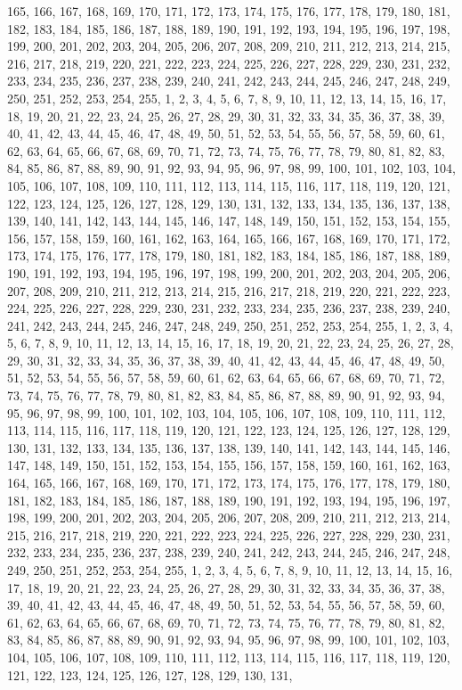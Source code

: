 165, 166, 167, 168, 169, 170, 171, 172, 173, 174, 175, 176, 177, 178, 179, 180, 181, 182, 183, 184, 185, 186, 187, 188, 189, 190, 191, 192, 193, 194, 195, 196, 197, 198, 199, 200, 201, 202, 203, 204, 205, 206, 207, 208, 209, 210, 211, 212, 213, 214, 215, 216, 217, 218, 219, 220, 221, 222, 223, 224, 225, 226, 227, 228, 229, 230, 231, 232, 233, 234, 235, 236, 237, 238, 239, 240, 241, 242, 243, 244, 245, 246, 247, 248, 249, 250, 251, 252, 253, 254, 255, 1, 2, 3, 4, 5, 6, 7, 8, 9, 10, 11, 12, 13, 14, 15, 16, 17, 18, 19, 20, 21, 22, 23, 24, 25, 26, 27, 28, 29, 30, 31, 32, 33, 34, 35, 36, 37, 38, 39, 40, 41, 42, 43, 44, 45, 46, 47, 48, 49, 50, 51, 52, 53, 54, 55, 56, 57, 58, 59, 60, 61, 62, 63, 64, 65, 66, 67, 68, 69, 70, 71, 72, 73, 74, 75, 76, 77, 78, 79, 80, 81, 82, 83, 84, 85, 86, 87, 88, 89, 90, 91, 92, 93, 94, 95, 96, 97, 98, 99, 100, 101, 102, 103, 104, 105, 106, 107, 108, 109, 110, 111, 112, 113, 114, 115, 116, 117, 118, 119, 120, 121, 122, 123, 124, 125, 126, 127, 128, 129, 130, 131, 132, 133, 134, 135, 136, 137, 138, 139, 140, 141, 142, 143, 144, 145, 146, 147, 148, 149, 150, 151, 152, 153, 154, 155, 156, 157, 158, 159, 160, 161, 162, 163, 164, 165, 166, 167, 168, 169, 170, 171, 172, 173, 174, 175, 176, 177, 178, 179, 180, 181, 182, 183, 184, 185, 186, 187, 188, 189, 190, 191, 192, 193, 194, 195, 196, 197, 198, 199, 200, 201, 202, 203, 204, 205, 206, 207, 208, 209, 210, 211, 212, 213, 214, 215, 216, 217, 218, 219, 220, 221, 222, 223, 224, 225, 226, 227, 228, 229, 230, 231, 232, 233, 234, 235, 236, 237, 238, 239, 240, 241, 242, 243, 244, 245, 246, 247, 248, 249, 250, 251, 252, 253, 254, 255, 1, 2, 3, 4, 5, 6, 7, 8, 9, 10, 11, 12, 13, 14, 15, 16, 17, 18, 19, 20, 21, 22, 23, 24, 25, 26, 27, 28, 29, 30, 31, 32, 33, 34, 35, 36, 37, 38, 39, 40, 41, 42, 43, 44, 45, 46, 47, 48, 49, 50, 51, 52, 53, 54, 55, 56, 57, 58, 59, 60, 61, 62, 63, 64, 65, 66, 67, 68, 69, 70, 71, 72, 73, 74, 75, 76, 77, 78, 79, 80, 81, 82, 83, 84, 85, 86, 87, 88, 89, 90, 91, 92, 93, 94, 95, 96, 97, 98, 99, 100, 101, 102, 103, 104, 105, 106, 107, 108, 109, 110, 111, 112, 113, 114, 115, 116, 117, 118, 119, 120, 121, 122, 123, 124, 125, 126, 127, 128, 129, 130, 131, 132, 133, 134, 135, 136, 137, 138, 139, 140, 141, 142, 143, 144, 145, 146, 147, 148, 149, 150, 151, 152, 153, 154, 155, 156, 157, 158, 159, 160, 161, 162, 163, 164, 165, 166, 167, 168, 169, 170, 171, 172, 173, 174, 175, 176, 177, 178, 179, 180, 181, 182, 183, 184, 185, 186, 187, 188, 189, 190, 191, 192, 193, 194, 195, 196, 197, 198, 199, 200, 201, 202, 203, 204, 205, 206, 207, 208, 209, 210, 211, 212, 213, 214, 215, 216, 217, 218, 219, 220, 221, 222, 223, 224, 225, 226, 227, 228, 229, 230, 231, 232, 233, 234, 235, 236, 237, 238, 239, 240, 241, 242, 243, 244, 245, 246, 247, 248, 249, 250, 251, 252, 253, 254, 255, 1, 2, 3, 4, 5, 6, 7, 8, 9, 10, 11, 12, 13, 14, 15, 16, 17, 18, 19, 20, 21, 22, 23, 24, 25, 26, 27, 28, 29, 30, 31, 32, 33, 34, 35, 36, 37, 38, 39, 40, 41, 42, 43, 44, 45, 46, 47, 48, 49, 50, 51, 52, 53, 54, 55, 56, 57, 58, 59, 60, 61, 62, 63, 64, 65, 66, 67, 68, 69, 70, 71, 72, 73, 74, 75, 76, 77, 78, 79, 80, 81, 82, 83, 84, 85, 86, 87, 88, 89, 90, 91, 92, 93, 94, 95, 96, 97, 98, 99, 100, 101, 102, 103, 104, 105, 106, 107, 108, 109, 110, 111, 112, 113, 114, 115, 116, 117, 118, 119, 120, 121, 122, 123, 124, 125, 126, 127, 128, 129, 130, 131, 